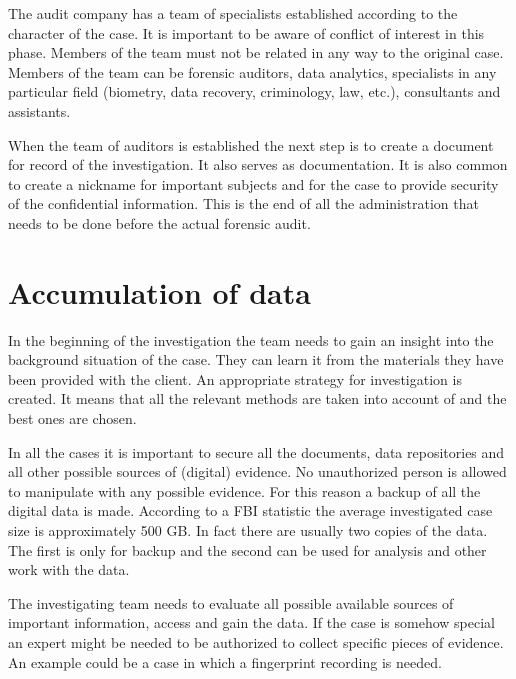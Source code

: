 The audit company has a team of specialists established according to the character of the case. It is important to be aware of conflict of interest in this phase. Members of the team must not be related in any way to the original case. Members of the team can be forensic auditors, data analytics, specialists in any particular field (biometry, data recovery, criminology, law, etc.), consultants and assistants. 

When the team of auditors is established the next step is to create a document for record of the investigation. It also serves as documentation. It is also common to create a nickname for important subjects and for the case to provide security of the confidential information. This is the end of all the administration that needs to be done before the actual forensic audit. %

\section{Accumulation of data}
In the beginning of the investigation the team needs to gain an insight into the background situation of the case. They can learn it from the materials they have been provided with the client. An appropriate strategy for investigation is created. It means that all the relevant methods are taken into account of and the best ones are chosen. 

In all the cases it is important to secure all the documents, data repositories and all other possible sources of (digital) evidence. No unauthorized person is allowed to manipulate with any possible evidence. For this reason a backup of all the digital data is made. According to a FBI statistic the average investigated case size is approximately 500 GB. \cite{ariu} In fact there are usually two copies of the data. The first is only for backup and the second can be used for analysis and other work with the data. 

The investigating team needs to evaluate all possible available sources of important information, access and gain the data. If the case is somehow special an expert might be needed to be authorized to collect specific pieces of evidence. An example could be a case in which a fingerprint recording is needed. 

